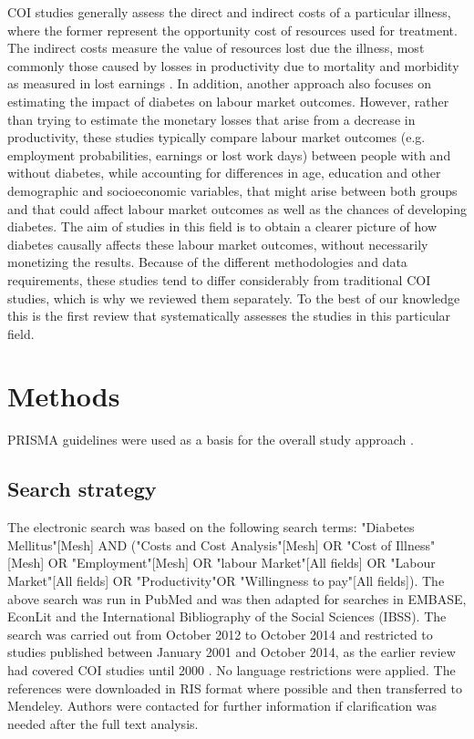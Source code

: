 \ac{COI} studies generally assess the direct and indirect costs of a particular illness, where the former represent the opportunity cost of resources used for treatment. The indirect costs measure the value of resources lost due the illness, most commonly those caused by losses in productivity due to mortality and morbidity as measured in lost earnings \parencite{Segel2006}. In addition, another approach also focuses on estimating the impact of diabetes on labour market outcomes. However, rather than trying to estimate the monetary losses that arise from a decrease in productivity, these studies typically compare labour market outcomes (e.g. employment probabilities, earnings or lost work days) between people with and without diabetes, while accounting for differences in age, education and other demographic and socioeconomic variables, that might arise between both groups and that could affect labour market outcomes as well as the chances of developing diabetes. The aim of studies in this field is to obtain a clearer picture of how diabetes causally affects these labour market outcomes, without necessarily monetizing the results. Because of the different methodologies and data requirements, these studies tend to differ considerably from traditional \ac{COI} studies, which is why we reviewed them separately. To the best of our knowledge this is the first review that systematically assesses the studies in this particular field.

\section{Methods}

\ac{PRISMA} guidelines were used as a basis for the overall study approach \parencite{Moher2009b}.
\subsection{Search strategy}
The electronic search was based on the following search terms: "Diabetes Mellitus"[Mesh] AND ("Costs and Cost Analysis"[Mesh] OR "Cost of Illness"[Mesh] OR "Employment"[Mesh] OR "labour Market"[All fields] OR "Labour Market"[All fields] OR "Productivity"OR "Willingness to pay"[All fields]). The above search was run in PubMed and was then adapted for searches in EMBASE, EconLit and the International Bibliography of the Social Sciences (IBSS). The search was carried out from October 2012 to October 2014 and restricted to studies published between January 2001 and October 2014, as the earlier review had covered \ac{COI} studies until 2000 \parencite{Ettaro2004}. No language restrictions were applied. The references were downloaded in RIS format where possible and then transferred to Mendeley. Authors were contacted for further information if clarification was needed after the full text analysis.

